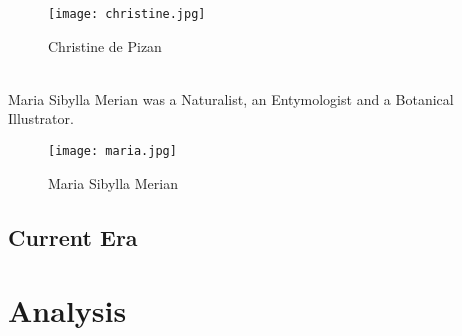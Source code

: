 \documentclass[a4paper,10pt]{article}
\begin{document}
\begin{center}
\begin{figure}[h]
\centering
 \texttt{[image: christine.jpg]}
 \caption{Christine de Pizan}
\end{figure}
\end{center}

\newblock
\\
Maria Sibylla Merian was a Naturalist, an Entymologist and a Botanical Illustrator.


\begin{center}
\begin{figure}[h]
\centering
 \texttt{[image: maria.jpg]}
 \caption{Maria Sibylla Merian}
\end{figure}
\end{center}


\subsection{Current Era}
\section{Analysis}
\end{document}
